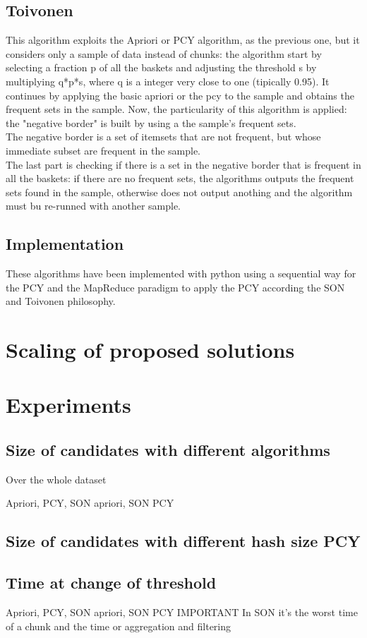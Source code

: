 \documentclass[14pt]{extarticle}
\begin{document}
\subsection{Toivonen}
This algorithm exploits the Apriori or PCY algorithm, as the previous one, but it considers only a sample of data instead of chunks: 
the algorithm start by selecting a fraction p of all the baskets and adjusting the threshold s by multiplying q*p*s, where q is a integer very close to one (tipically 0.95). It continues by applying the basic apriori or the pcy to the sample and obtains the frequent sets in the sample. Now, the particularity of this algorithm is applied: the "negative border" is built by using a the sample's frequent sets.\\
The negative border is a set of itemsets that are not frequent, but whose immediate subset are frequent in the sample.\\
The last part is checking if there is a set in the negative border that is frequent in all the baskets: if there are no frequent sets, the algorithms outputs the frequent sets found in the sample, otherwise does not output anothing and the algorithm must bu re-runned with another sample.

\subsection{Implementation}
These algorithms have been implemented with python using a sequential way for the PCY and the MapReduce paradigm to apply the PCY according the SON and Toivonen philosophy.


\section{Scaling of proposed solutions}
\section{Experiments}
\subsection{Size of candidates with different algorithms}
Over the whole dataset

Apriori, PCY, SON apriori, SON PCY
\subsection{Size of candidates with different hash size PCY}
\subsection{Time at change of threshold}
Apriori, PCY, SON apriori, SON PCY
IMPORTANT
In SON it's the worst time of a chunk and the time or aggregation and filtering
\end{document}

